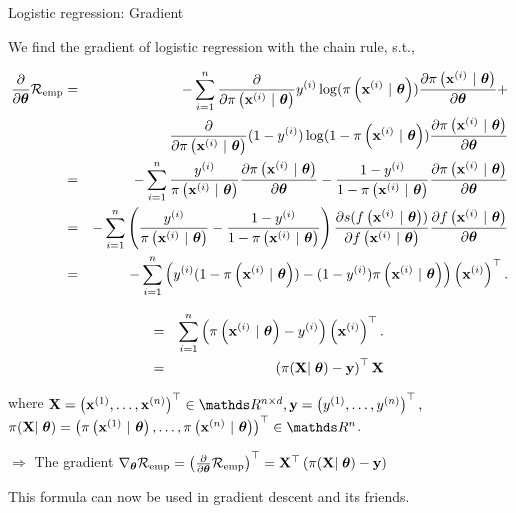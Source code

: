 \documentclass[11pt,compress,t,notes=noshow, xcolor=table]{beamer}
\begin{document}
\begin{vbframe}{Logistic regression: Gradient}

We find the gradient of logistic regression with the chain rule, s.t., 

\vspace*{-0.5cm}

\begin{align*}
  \frac{\partial}{\partial\thetab}\riske  & = & 
 -\sumin \frac{\partial}{\partial\pixit }\yi\log(\pixit)\frac{\partial\pixit}{\partial \thetab} +  \\
 &&  \frac{\partial}{\partial\pixit} (1-\yi)\log(1-\pixit)\frac{\partial\pixit}{\partial \thetab}\\
 & = & 
 -\sumin \frac{\yi}{\pixit}\frac{\partial\pixit}{\partial \thetab} -  \frac{1-\yi}{1-\pixit}\frac{\partial\pixit}{\partial \thetab}\\
 &=&  
  -\sumin \left(\frac{\yi}{\pixit} -  \frac{1-\yi}{1-\pixit}\right)\frac{\partial s(\fxit)}{\partial  \fxit}\frac{\partial  \fxit}{\partial\thetab}\\
  &=&  
  -\sum^n_{i=1} \left(\yi(1-\pixit)  -  (1-\yi)\pixit \right)\left(\xi\right)^\top.\\
\end{align*}



\framebreak
\begin{align*}
  \quad &=& 
  \sumin \left(\pixit - \yi\right)\left(\xi\right)^\top.\\
    \quad &=& 
  \left(\pi(\mathbf{X}\vert\;\thetab) - \mathbf{y}\right)^\top\mathbf{X}\\
\end{align*}

where  $\mathbf{X} = \left(
    \xi[1], \dots, 
    \xi[n]\right)^\top \in \R^{n\times d}, \mathbf{y} = \left(
    \yi[1], \dots,
    \yi[n]
\right)^\top,$ \\ $\pi(\mathbf{X}\vert\;\thetab) = \left(
    \pixit[1], \dots,
    \pixit[n]
\right)^\top \in \R^{n}$.

\vspace*{1cm}

$\Rightarrow$ The gradient $\nabla_{\thetab}\riske = \left(\frac{\partial}{\partial\thetab}\riske\right)^\top =  \mathbf{X}^\top\left(\pi(\mathbf{X}\vert\;\thetab) - \mathbf{y}\right)$ 

\vspace*{1cm}

This formula can now be used in gradient descent and its friends.

\end{vbframe}
\end{document}
